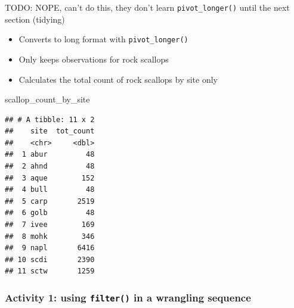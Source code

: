 \documentclass[]{book}
\newenvironment{Shaded}{\begin{snugshade}}{\end{snugshade}}
\newcommand{\CommentTok}[1]{\textcolor[rgb]{0.56,0.35,0.01}{\textit{#1}}}
\newcommand{\DataTypeTok}[1]{\textcolor[rgb]{0.13,0.29,0.53}{#1}}
\newcommand{\KeywordTok}[1]{\textcolor[rgb]{0.13,0.29,0.53}{\textbf{#1}}}
\newcommand{\NormalTok}[1]{#1}
\newcommand{\OperatorTok}[1]{\textcolor[rgb]{0.81,0.36,0.00}{\textbf{#1}}}
\newcommand{\OtherTok}[1]{\textcolor[rgb]{0.56,0.35,0.01}{#1}}
\newcommand{\StringTok}[1]{\textcolor[rgb]{0.31,0.60,0.02}{#1}}
\providecommand{\tightlist}{%
  \setlength{\itemsep}{0pt}\setlength{\parskip}{0pt}}
\begin{document}
TODO: NOPE, can't do this, they don't learn \texttt{pivot\_longer()} until the next section (tidying)

\begin{itemize}
\tightlist
\item
  Converts to long format with \texttt{pivot\_longer()}
\item
  Only keeps observations for rock scallops
\item
  Calculates the total count of rock scallops by site only
\end{itemize}

\begin{Shaded}
\end{Shaded}

\begin{Shaded}
\begin{Highlighting}[]
\NormalTok{scallop_count_by_site}
\end{Highlighting}
\end{Shaded}

\begin{verbatim}
## # A tibble: 11 x 2
##    site  tot_count
##    <chr>     <dbl>
##  1 abur         48
##  2 ahnd         48
##  3 aque        152
##  4 bull         48
##  5 carp       2519
##  6 golb         48
##  7 ivee        169
##  8 mohk        346
##  9 napl       6416
## 10 scdi       2390
## 11 sctw       1259
\end{verbatim}

\hypertarget{activity-1-using-filter-in-a-wrangling-sequence}{%
\subsubsection{\texorpdfstring{Activity 1: using \texttt{filter()} in a wrangling sequence}{Activity 1: using filter() in a wrangling sequence}}\label{activity-1-using-filter-in-a-wrangling-sequence}}
\end{document}
